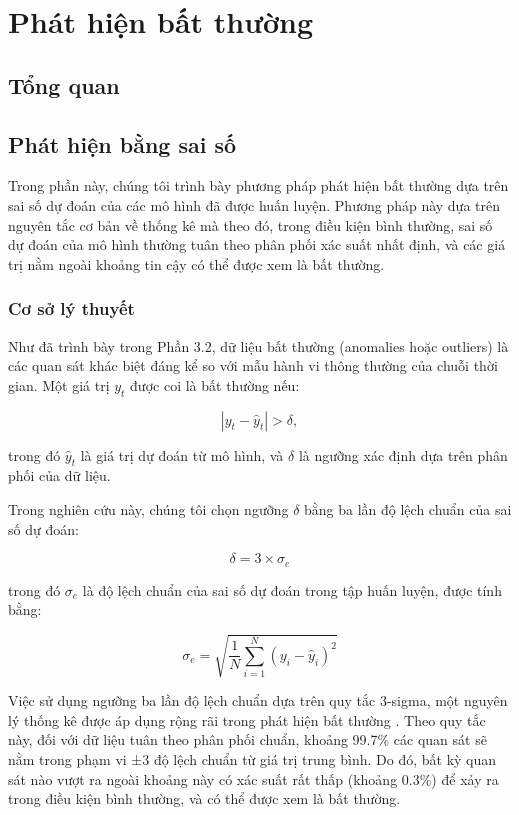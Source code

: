 \section{Phát hiện bất thường}
\subsection{Tổng quan}

\subsection{Phát hiện bằng sai số}
Trong phần này, chúng tôi trình bày phương pháp phát hiện bất thường dựa trên sai số dự đoán của các mô hình đã được huấn luyện. Phương pháp này dựa trên nguyên tắc cơ bản về thống kê mà theo đó, trong điều kiện bình thường, sai số dự đoán của mô hình thường tuân theo phân phối xác suất nhất định, và các giá trị nằm ngoài khoảng tin cậy có thể được xem là bất thường.

\subsubsection{Cơ sở lý thuyết}
Như đã trình bày trong Phần 3.2, dữ liệu bất thường (anomalies hoặc outliers) là các quan sát khác biệt đáng kể so với mẫu hành vi thông thường của chuỗi thời gian. Một giá trị \( y_t \) được coi là bất thường nếu:

\begin{equation}
    |y_t - \hat{y}_t| > \delta,
\end{equation}

trong đó \(\hat{y}_t\) là giá trị dự đoán từ mô hình, và \(\delta\) là ngưỡng xác định dựa trên phân phối của dữ liệu.

Trong nghiên cứu này, chúng tôi chọn ngưỡng \(\delta\) bằng ba lần độ lệch chuẩn của sai số dự đoán:

\begin{equation}
\delta = 3 \times \sigma_e
\end{equation}

trong đó \(\sigma_e\) là độ lệch chuẩn của sai số dự đoán trong tập huấn luyện, được tính bằng:

\begin{equation}
\sigma_e = \sqrt{\frac{1}{N} \sum_{i=1}^{N} (y_i - \hat{y}_i)^2}
\end{equation}

Việc sử dụng ngưỡng ba lần độ lệch chuẩn dựa trên quy tắc 3-sigma, một nguyên lý thống kê được áp dụng rộng rãi trong phát hiện bất thường \cite{malhotra2016lstm, hundman2018detecting}. Theo quy tắc này, đối với dữ liệu tuân theo phân phối chuẩn, khoảng 99.7\% các quan sát sẽ nằm trong phạm vi ±3 độ lệch chuẩn từ giá trị trung bình. Do đó, bất kỳ quan sát nào vượt ra ngoài khoảng này có xác suất rất thấp (khoảng 0.3\%) để xảy ra trong điều kiện bình thường, và có thể được xem là bất thường.

